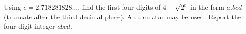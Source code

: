 Using $e=2.718281828\ldots$, find the first four digits of $4-\sqrt{2^e}$ in the form $a.bcd$ (truncate after the third decimal place). A calculator may be used. Report the four-digit integer $\overline{abcd}$.
